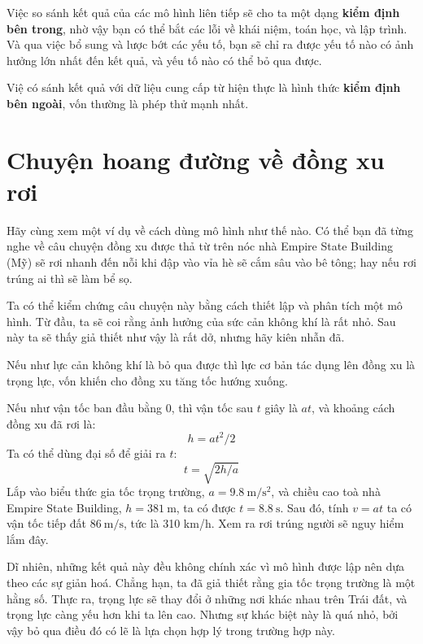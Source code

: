 \documentclass[12pt, openany]{book}
\theoremstyle{exercise}
\begin{document}
Việc so sánh kết quả của các mô hình liên tiếp sẽ cho ta một dạng {\bf kiểm định bên trong}, nhờ vậy bạn có thể bắt các lỗi về khái niệm, toán học, và lập trình. Và qua việc bổ sung và lược bớt các yếu tố, bạn sẽ chỉ ra được yếu tố nào có ảnh hưởng lớn nhất đến kết quả, và yếu tố nào có thể bỏ qua được.


Việ có sánh kết quả với dữ liệu cung cấp từ hiện thực là hình thức {\bf kiểm định bên ngoài}, vốn thường là phép thử mạnh nhất.


\section{Chuyện hoang đường về đồng xu rơi}
\label{penny}

Hãy cùng xem một ví dụ về cách dùng mô hình như thế nào. Có thể bạn đã từng nghe về câu chuyện đồng xu được thả từ trên nóc nhà Empire State Building (Mỹ) sẽ rơi nhanh đến nỗi khi đập vào vỉa hè sẽ cắm sâu vào bê tông; hay nếu rơi trúng ai thì sẽ làm bể sọ.


Ta có thể kiểm chứng câu chuyện này bằng cách thiết lập và phân tích một mô hình. Từ đầu, ta sẽ coi rằng ảnh hưởng của sức cản không khí là rất nhỏ. Sau này ta sẽ thấy giả thiết như vậy là rất dở, nhưng hãy kiên nhẫn đã.

Nếu như lực cản không khí là bỏ qua được thì lực cơ bản tác dụng lên đồng xu là trọng lực, vốn khiến cho đồng xu tăng tốc hướng xuống. 

Nếu như vận tốc ban đầu bằng 0, thì vận tốc sau $t$ giây là $a t$, và khoảng cách đồng xu đã rơi là:
%
\[ h = a t^2 / 2 \]
%
Ta có thể dùng đại số để giải ra $t$:
%
\[ t = \sqrt{ 2 h / a} \]
%
Lắp vào biểu thức gia tốc trọng trường, $a = \SI{9.8}{\meter\per\second\squared}$, và chiều cao toà nhà Empire State Building, $h=\SI{381}{\meter}$, ta có được $t = \SI{8.8}{\second}$.  Sau đó, tính $v = a t$ ta có vận tốc tiếp đất $\SI{86}{\meter\per\second}$, tức là 310 km/h.  Xem ra rơi trúng người sẽ nguy hiểm lắm đây.

Dĩ nhiên, những kết quả này đều không chính xác vì mô hình được lập nên dựa theo các sự giản hoá. Chẳng hạn, ta đã giả thiết rằng gia tốc trọng trường là một hằng số. Thực ra, trọng lực sẽ thay đổi ở những nơi khác nhau trên Trái đất, và trọng lực càng yếu hơn khi ta lên cao. Nhưng sự khác biệt này là quá nhỏ, bởi vậy bỏ qua điều đó có lẽ là lựa chọn hợp lý trong trường hợp này.
\end{document}
